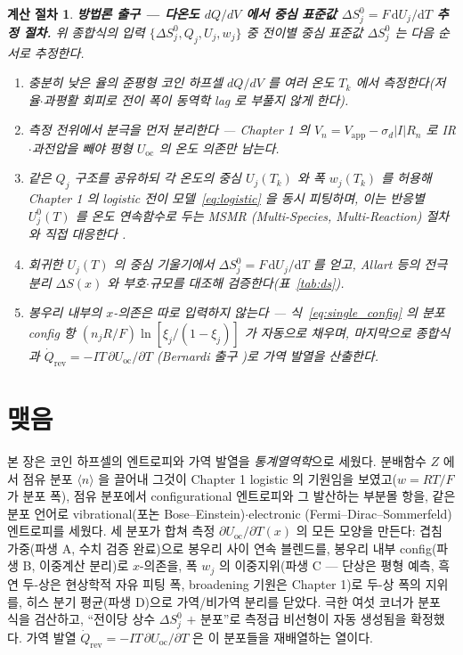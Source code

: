 \documentclass[11pt,a4paper]{article}
\newtheorem*{procedurebox}{계산 절차}
\newcommand{\dd}{\mathrm{d}}
\newcommand{\rev}{\mathrm{rev}}
\newcommand{\oc}{\mathrm{oc}}
\newcommand{\avg}[1]{\langle #1\rangle}
\begin{document}
\begin{procedurebox}
\textbf{방법론 출구 — 다온도 $dQ/dV$ 에서 중심 표준값 $\Delta S^0_j=F\,\dd U_j/\dd T$ 추정 절차.} 위 종합식의 입력
$\{\Delta S^0_j,Q_j,U_j,w_j\}$ 중 전이별 중심 표준값 $\Delta S^0_j$ 는 다음 순서로 추정한다.
\begin{enumerate}[leftmargin=1.8em,itemsep=2pt,topsep=2pt]
\item 충분히 낮은 율의 준평형 코인 하프셀 $dQ/dV$ 를 여러 온도 $T_k$ 에서 측정한다(저율$\cdot$과평활 회피로
전이 폭이 동역학 lag 로 부풀지 않게 한다).
\item 측정 전위에서 분극을 먼저 분리한다 — Chapter 1 의 $V_n=V_\mathrm{app}-\sigma_d|I|R_n$ 로 IR$\cdot$과전압을
빼야 \emph{평형} $U_\oc$ 의 온도 의존만 남는다.
\item 같은 $Q_j$ 구조를 공유하되 각 온도의 중심 $U_j(T_k)$ 와 폭 $w_j(T_k)$ 를 허용해 Chapter 1 의 logistic
전이 모델~\eqref{eq:logistic} 을 \emph{동시} 피팅하며, 이는 반응별 $U_j^0(T)$ 를 온도 연속함수로 두는 MSMR
(Multi-Species, Multi-Reaction) 절차와 직접 대응한다 \cite{msmr_partI,msmr_partII}.
\item 회귀한 $U_j(T)$ 의 중심 기울기에서 $\Delta S^0_j=F\,\dd U_j/\dd T$ 를 얻고, Allart 등의 전극 분리
$\Delta S(x)$ \cite{allart2018} 와 부호$\cdot$규모를 대조해 검증한다(표~\ref{tab:ds}).
\item 봉우리 \emph{내부}의 $x$-의존은 따로 입력하지 않는다 — 식~\eqref{eq:single_config} 의 분포 config 항
$(n_jR/F)\ln[\xi_j/(1-\xi_j)]$ 가 자동으로 채우며, 마지막으로 종합식과 $\dot Q_\rev=-IT\,\partial U_\oc/\partial T$
(Bernardi 출구 \cite{bernardi1985})로 가역 발열을 산출한다.
\end{enumerate}
\end{procedurebox}

\section*{맺음}
본 장은 코인 하프셀의 엔트로피와 가역 발열을 \emph{통계열역학}으로 세웠다. 분배함수 $Z$ 에서 점유 분포
$\avg{n}$ 을 끌어내 그것이 Chapter 1 logistic 의 기원임을 보였고($w=RT/F$ 가 분포 폭), 점유 분포에서
configurational 엔트로피와 그 발산하는 부분몰 항을, 같은 분포 언어로 vibrational(포논 Bose--Einstein)$\cdot$electronic
(Fermi--Dirac--Sommerfeld) 엔트로피를 세웠다. 세 분포가 합쳐 측정 $\partial U_\oc/\partial T(x)$ 의 모든 모양을 만든다:
겹침 가중(파생 A, 수치 검증 완료)으로 봉우리 사이 연속 블렌드를, 봉우리 내부 config(파생 B, 이중계산 분리)로
$x$-의존을, 폭 $w_j$ 의 이중지위(파생 C — 단상은 평형 예측, 흑연 두-상은 현상학적 자유 피팅 폭, broadening
기원은 Chapter 1)로 두-상 폭의 지위를, 히스 분기 평균(파생 D)으로 가역/비가역
분리를 닫았다. 극한 여섯 코너가 분포 식을 검산하고, ``전이당 상수 $\Delta S^0_j$ $+$ 분포''로 측정급 비선형이
자동 생성됨을 확정했다. 가역 발열 $\dot Q_\rev=-IT\,\partial U_\oc/\partial T$ 은 이 분포들을 재배열하는 열이다.
\end{document}
